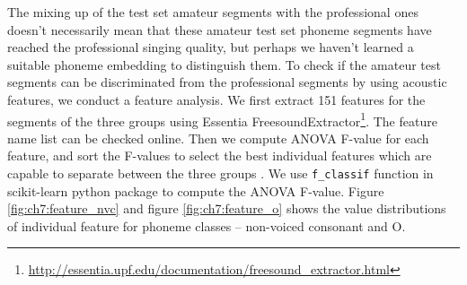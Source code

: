 The mixing up of the test set amateur segments with the professional ones doesn't necessarily mean that these amateur test set phoneme segments have reached the professional singing quality, but perhaps we haven't learned a suitable phoneme embedding to distinguish them. To check if the amateur test segments can be discriminated from the professional segments by using acoustic features, we conduct a feature analysis. We first extract 151 features for the segments of the three groups using Essentia FreesoundExtractor\footnote{\url{http://essentia.upf.edu/documentation/freesound\_extractor.html}\label{foot:freesound}}. The feature name list can be checked online.
Then we compute \gls{ANOVA} F-value for each feature, and sort the F-values to select the best individual features which are capable to separate between the three groups \cite{Stollera}. We use \texttt{f\_classif} function in scikit-learn python package to compute the \gls{ANOVA} F-value. Figure \ref{fig:ch7:feature_nvc} and figure \ref{fig:ch7:feature_o} shows the value distributions of individual feature for phoneme classes -- non-voiced consonant and O. 

